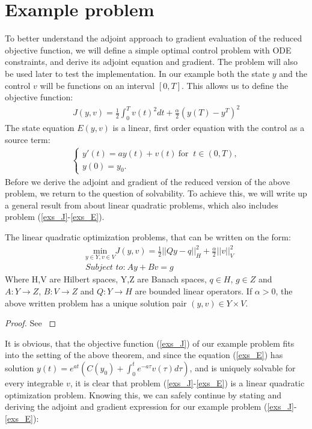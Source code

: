 \section{Example problem}
To better understand the adjoint approach to gradient evaluation of the reduced objective function, we will define a simple optimal control problem with ODE constraints, and derive its adjoint equation and gradient. The problem will also be used later to test the implementation. In our example both the state $y$ and the control $v$ will be functions on an interval $[0,T]$. This allows us to define the objective function:
\begin{align}
J(y,v) = \frac{1}{2}\int_0^Tv(t)^2dt + \frac{\alpha}{2}(y(T)-y^T)^2 \label{exs_J}
\end{align}
The state equation $E(y,v)$ is a linear, first order equation with the control as a source term:
\begin{align}
\left\{
     \begin{array}{lr}
       	y'(t)=ay(t) + v(t) \ \textrm{for } \ t\in(0,T),\\
       	y(0)=y_0.
     \end{array}
   \right. \label{exs_E}
\end{align}
Before we derive the adjoint and gradient of the reduced version of the above problem, we  return to the question of solvability. To achieve this, we will write up a general result from \cite{hinze2008optimization} about linear quadratic problems, which also includes problem (\ref{exs_J}-\ref{exs_E}).
\begin{theorem}
The linear quadratic optimization problems, that can be written on the form:
\begin{align*}
&\underset{y\in Y,v\in V}{\text{min}}J(y,v) = \frac{1}{2}||Qy-q||_H^2 + \frac{\alpha}{2}||v||_V^2 \\
&\textit{Subject to:} \ Ay + Bv = g
\end{align*}
Where H,V are Hilbert spaces, Y,Z are Banach spaces, $q\in H$, $g\in Z$ and $A:Y\rightarrow Z$, $B:V\rightarrow Z$ and $Q:Y\rightarrow H$ are bounded linear operators. If $\alpha>0$, the above written problem has a unique solution pair $(y,v)\in Y\times V$.
\end{theorem}   
\begin{proof}
See \cite{hinze2008optimization}
\end{proof}
It is obvious, that the objective function (\ref{exs_J}) of our example problem fits into the setting of the above theorem, and since the equation (\ref{exs_E}) has solution $y(t) = e^{a t}(C(y_0)+\int_0^te^{-a\tau}v(\tau)d\tau)$, and is uniquely solvable for every integrable $v$, it is clear that problem (\ref{exs_J}-\ref{exs_E}) is a linear quadratic optimization problem. Knowing this, we can safely continue by stating and deriving the adjoint and gradient expression for our example problem (\ref{exs_J}-\ref{exs_E}): 
